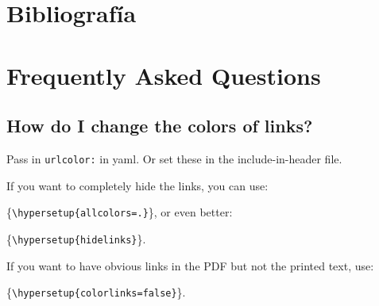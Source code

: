 \documentclass[
  letterpaper,
  11pt,
  spanish,
  singlespacing,
  headsepline]{MastersDoctoralThesis}
\begin{document}

\hypertarget{bibliografuxeda}{%
\chapter*{Bibliografía}\label{bibliografuxeda}}


\printbibliography[heading=none]

\cleardoublepage
{}
{}
\appendix

\hypertarget{sec-appA}{%
\chapter{Frequently Asked Questions}\label{sec-appA}}

\hypertarget{how-do-i-change-the-colors-of-links}{%
\section{How do I change the colors of
links?}\label{how-do-i-change-the-colors-of-links}}

Pass in \texttt{urlcolor:} in yaml. Or set these in the
include-in-header file.

\noindent If you want to completely hide the links, you can use:

\{\small\verb!\hypersetup{allcolors=.}!\}, or even better:

\{\small\verb!\hypersetup{hidelinks}!\}.

\noindent If you want to have obvious links in the PDF but not the
printed text, use:

\{\small\verb!\hypersetup{colorlinks=false}!\}.
\end{document}
